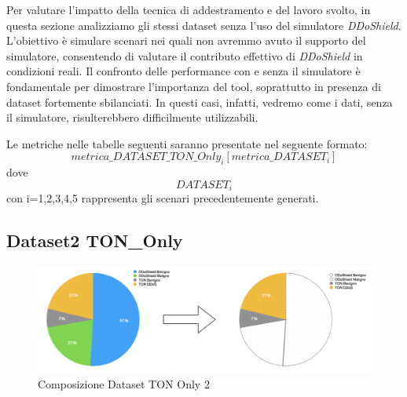 Per valutare l'impatto della tecnica di addestramento e del lavoro svolto, in questa sezione analizziamo gli stessi dataset senza l'uso del simulatore \textit{DDoShield}. L'obiettivo è simulare scenari nei quali non avremmo avuto il supporto del simulatore, consentendo di valutare il contributo effettivo di \textit{DDoShield} in condizioni reali. Il confronto delle performance con e senza il simulatore è fondamentale per dimostrare l'importanza del tool, soprattutto in presenza di dataset fortemente sbilanciati. In questi casi, infatti, vedremo come i dati, senza il simulatore, risulterebbero difficilmente utilizzabili.

Le metriche nelle tabelle seguenti saranno presentate nel seguente formato:
\[metrica\_DATASET\_TON\_Only_i [metrica\_DATASET_i]\]
dove \[DATASET_i\] con i=1,2,3,4,5 rappresenta gli scenari precedentemente generati.



\subsection{Dataset2 TON\_Only}

\begin{figure}[htbp]
\centering
\includegraphics[scale= 0.6]{UNINA_MSc_Thesis_Project/img/chapterRisulati/TON_Only/composizione_TON_ONLY2.png}
  \caption{Composizione Dataset TON Only 2}
\end{figure}

